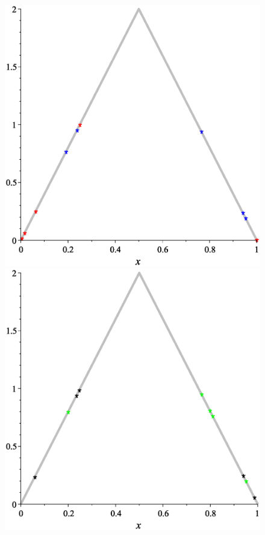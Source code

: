 \documentclass[12pt,a4paper]{amsart}
\begin{document}
\begin{figure}[h!]
\centering
\includegraphics[scale=0.28]{Fig3a}
\hspace{1cm}
\includegraphics[scale=0.28]{Fig3b}

\end{figure}
\end{document}
